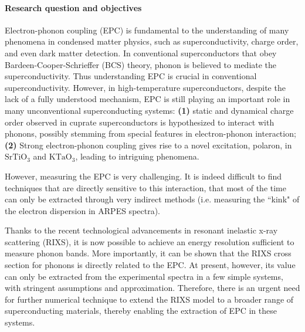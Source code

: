 \documentclass[11pt]{article}
\begin{document}
\paragraph{Research question and objectives}
Electron-phonon coupling (EPC) is fundamental to the understanding of many phenomena in condensed matter physics, such as superconductivity\cite{bardeen_theory_1957,cuk_review_2005}, charge order\cite{arpaia_charge_2021,comin_resonant_2016,tranquada_spins_2013}, and even dark matter detection\cite{griffin_directional_2018}. 
In conventional superconductors that obey Bardeen-Cooper-Schrieffer (BCS) theory, phonon is believed to mediate the superconductivity\cite{bardeen_theory_1957}. 
Thus understanding EPC is crucial in conventional superconductivity. 
However, in high-temperature superconductors, despite the lack of a fully understood mechanism, EPC is still playing an important role in many unconventional superconducting systems: \textbf{(1)} static and dynamical charge order observed in cuprate superconductors is hypothesized to interact with phonons, possibly stemming from special features in electron-phonon interaction\cite{lin_strongly_2020, wang_charge_2021, huang_quantum_2021, miao_incommensurate_2018,tacon_inelastic_2014,li_multiorbital_2020,li_multiorbital_2020,chaix_dispersive_2017,braicovich_determining_2020,huang_quantum_2021}; 
\textbf{(2)} Strong electron-phonon coupling gives rise to a novel excitation, polaron, in $\mathrm{SrTiO_3}$ and $\mathrm{KTaO_3}$, leading to intriguing phenomena\cite{swartz_polaronic_2018,chen_orientation-dependent_2023}. 

However, measuring the EPC is very challenging. 
It is indeed difficult to find techniques that are directly sensitive to this interaction, that most of the time can only be extracted through very indirect methods (i.e. measuring the ``kink" of the electron dispersion in ARPES spectra).

Thanks to the recent technological advancements in resonant inelastic x-ray scattering (RIXS), it is now possible to achieve an energy resolution sufficient to measure phonon bands. 
More importantly, it can be shown that the RIXS cross section for phonons is directly related to the EPC\cite{ament_determining_2011, devereaux_directly_2016}. 
At present, however, its value can only be extracted from the experimental spectra in a few simple systems, with stringent assumptions and approximation\cite{braicovich_determining_2020,vale_high-resolution_2019}. 
Therefore, there is an urgent need for further numerical technique to extend the RIXS model to a broader range of superconducting materials, thereby enabling the extraction of EPC in these systems. 
\end{document}

